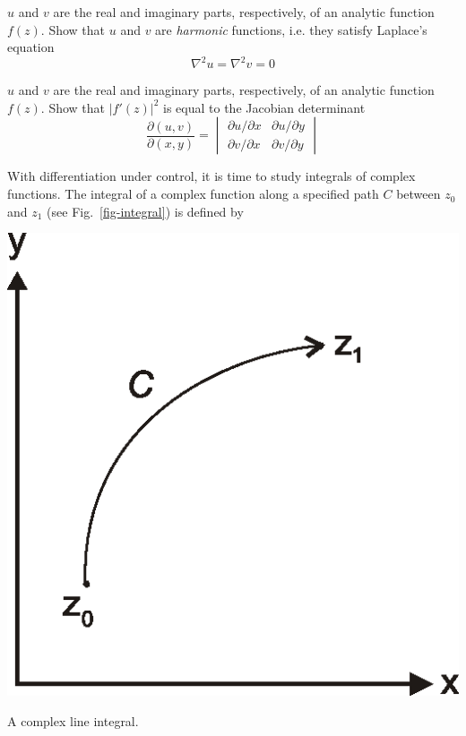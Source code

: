\begin{exer}
\label{ex-harmonic}
$u$ and $v$ are the real and imaginary parts, respectively, of an analytic function $f(z)$. Show that $u$ and $v$ are \emph{harmonic} functions, i.e. they satisfy Laplace's equation
$$\nabla^2 u = \nabla^2 v = 0$$
\end{exer}

\begin{exer}
$u$ and $v$ are the real and imaginary parts, respectively, of an analytic function $f(z)$. Show that $|f'(z)|^2$ is equal to the Jacobian determinant
$$\frac{\partial (u,v)}{\partial (x,y)} =  \begin{vmatrix} \partial u / \partial x & \partial u / \partial y \\ \partial v / \partial x & \partial v / \partial y \end{vmatrix}$$
\end{exer}



With differentiation under control, it is time to study integrals of complex functions. The integral of a complex function along a specified path ${C}$ between $z_0$ and $z_1$ (see Fig.~\ref{fig-integral}) is defined by

\begin{marginfigure}[-0.0cm]
\centering
\includegraphics{complex/figures/integral}
\caption{A complex line integral.}
\label{fig-integral}
\end{marginfigure}


